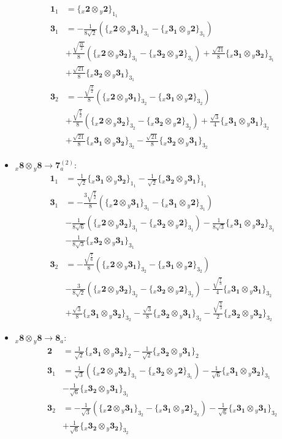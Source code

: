 \documentclass[english]{article}
\newcommand{\rep}[1]{\mathbf{#1}}
\newcommand{\repx}[2]{{}_{#2}\mathbf{#1}}
\newcommand{\subcg}[3]{\big\{ \repx{#1}{x}\otimes\repx{#2}{y}\big\}^{}_{#3}}
\begin{document}
\begin{itemize}
\begin{align*}
\rep{1}_{1} & = \subcg{2}{2}{1_{1}}
\\
\rep{3}_{1} & = -\frac{1}{8 \sqrt{2}}\left(\subcg{2}{3_{1}}{3_{1}}-\subcg{3_{1}}{2}{3_{1}}\right) \\ 
 & +\frac{\sqrt{\frac{21}{2}}}{8}\left(\subcg{2}{3_{2}}{3_{1}}-\subcg{3_{2}}{2}{3_{1}}\right)+\frac{\sqrt{21}}{8}\subcg{3_{1}}{3_{2}}{3_{1}} \\ 
 & +\frac{\sqrt{21}}{8}\subcg{3_{2}}{3_{1}}{3_{1}}
\\
\rep{3}_{2} & = -\frac{\sqrt{\frac{3}{2}}}{8}\left(\subcg{2}{3_{1}}{3_{2}}-\subcg{3_{1}}{2}{3_{2}}\right) \\ 
 & +\frac{\sqrt{\frac{7}{2}}}{8}\left(\subcg{2}{3_{2}}{3_{2}}-\subcg{3_{2}}{2}{3_{2}}\right)+\frac{\sqrt{3}}{4}\subcg{3_{1}}{3_{1}}{3_{2}} \\ 
 & +\frac{\sqrt{21}}{8}\subcg{3_{1}}{3_{2}}{3_{2}}-\frac{\sqrt{21}}{8}\subcg{3_{2}}{3_{1}}{3_{2}}
\end{align*}
\item $\repx{8}{x}\otimes\repx{8}{y}\to\rep{7}_{a}^{(2)}$:
\begin{align*}
\rep{1}_{1} & = \frac{1}{\sqrt{2}}\subcg{3_{1}}{3_{2}}{1_{1}}-\frac{1}{\sqrt{2}}\subcg{3_{2}}{3_{1}}{1_{1}}
\\
\rep{3}_{1} & = -\frac{3 \sqrt{\frac{7}{2}}}{8}\left(\subcg{2}{3_{1}}{3_{1}}-\subcg{3_{1}}{2}{3_{1}}\right) \\ 
 & -\frac{1}{8 \sqrt{6}}\left(\subcg{2}{3_{2}}{3_{1}}-\subcg{3_{2}}{2}{3_{1}}\right)-\frac{1}{8 \sqrt{3}}\subcg{3_{1}}{3_{2}}{3_{1}} \\ 
 & -\frac{1}{8 \sqrt{3}}\subcg{3_{2}}{3_{1}}{3_{1}}
\\
\rep{3}_{2} & = -\frac{\sqrt{\frac{7}{6}}}{8}\left(\subcg{2}{3_{1}}{3_{2}}-\subcg{3_{1}}{2}{3_{2}}\right) \\ 
 & -\frac{3}{8 \sqrt{2}}\left(\subcg{2}{3_{2}}{3_{2}}-\subcg{3_{2}}{2}{3_{2}}\right)-\frac{\sqrt{\frac{7}{3}}}{4}\subcg{3_{1}}{3_{1}}{3_{2}} \\ 
 & +\frac{\sqrt{3}}{8}\subcg{3_{1}}{3_{2}}{3_{2}}-\frac{\sqrt{3}}{8}\subcg{3_{2}}{3_{1}}{3_{2}}-\frac{\sqrt{\frac{7}{3}}}{2}\subcg{3_{2}}{3_{2}}{3_{2}}
\end{align*}
\item $\repx{8}{x}\otimes\repx{8}{y}\to\rep{8}_{a}$:
\begin{align*}
\rep{2} & = \frac{1}{\sqrt{2}}\subcg{3_{1}}{3_{2}}{2}-\frac{1}{\sqrt{2}}\subcg{3_{2}}{3_{1}}{2}
\\
\rep{3}_{1} & = \frac{1}{\sqrt{3}}\left(\subcg{2}{3_{2}}{3_{1}}-\subcg{3_{2}}{2}{3_{1}}\right)-\frac{1}{\sqrt{6}}\subcg{3_{1}}{3_{2}}{3_{1}} \\ 
 & -\frac{1}{\sqrt{6}}\subcg{3_{2}}{3_{1}}{3_{1}}
\\
\rep{3}_{2} & = -\frac{1}{\sqrt{3}}\left(\subcg{2}{3_{1}}{3_{2}}-\subcg{3_{1}}{2}{3_{2}}\right)-\frac{1}{\sqrt{6}}\subcg{3_{1}}{3_{1}}{3_{2}} \\ 
 & +\frac{1}{\sqrt{6}}\subcg{3_{2}}{3_{2}}{3_{2}}
\end{align*}
\end{itemize}
\end{document}
